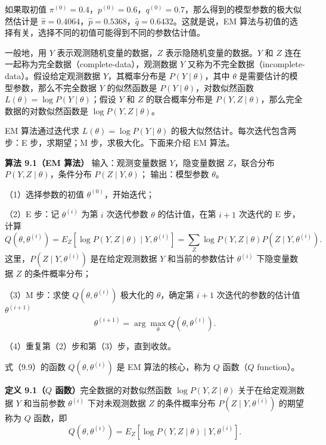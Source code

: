 \documentclass[UTF8, 12pt, fontset=fandol, oneside]{ctexart}
\begin{document}
如果取初值 $\pi^{(0)}=0.4$，$p^{(0)}=0.6$，$q^{(0)}=0.7$，那么得到的模型参数的极大似然估计是 $\hat{\pi}=0.4064$，$\hat{p}=0.5368$，$\hat{q}=0.6432$。这就是说，EM 算法与初值的选择有关，选择不同的初值可能得到不同的参数估计值。

一般地，用 $Y$ 表示观测随机变量的数据，$Z$ 表示隐随机变量的数据。$Y$ 和 $Z$ 连在一起称为完全数据（complete-data），观测数据 $Y$ 又称为不完全数据（incomplete-data）。假设给定观测数据 $Y$，其概率分布是 $P(Y\mid\theta)$，其中 $\theta$ 是需要估计的模型参数，那么不完全数据 $Y$ 的似然函数是 $P(Y\mid\theta)$，对数似然函数 $L(\theta)=\log P(Y\mid\theta)$；假设 $Y$ 和 $Z$ 的联合概率分布是 $P(Y,Z\mid\theta)$，那么完全数据的对数似然函数是 $\log P(Y,Z\mid\theta)$。

EM 算法通过迭代求 $L(\theta)=\log P(Y\mid\theta)$ 的极大似然估计。每次迭代包含两步：E 步，求期望；M 步，求极大化。下面来介绍 EM 算法。

\noindent\textbf{算法 9.1（EM 算法）}\quad
输入：观测变量数据 $Y$，隐变量数据 $Z$，联合分布 $P(Y,Z\mid\theta)$，条件分布 $P(Z\mid Y,\theta)$；
输出：模型参数 $\theta$。

（1）选择参数的初值 $\theta^{(0)}$，开始迭代；

（2）E 步：记 $\theta^{(i)}$ 为第 $i$ 次迭代参数 $\theta$ 的估计值，在第 $i+1$ 次迭代的 E 步，计算
\begin{equation}
  Q(\theta,\theta^{(i)})
  =E_Z[\log P(Y,Z\mid\theta)\mid Y,\theta^{(i)}]
  =\sum_Z \log P(Y,Z\mid\theta)P(Z\mid Y,\theta^{(i)}).
  \tag{9.9}
\end{equation}
这里，$P(Z\mid Y,\theta^{(i)})$ 是在给定观测数据 $Y$ 和当前的参数估计 $\theta^{(i)}$ 下隐变量数据 $Z$ 的条件概率分布；

（3）M 步：求使 $Q(\theta,\theta^{(i)})$ 极大化的 $\theta$，确定第 $i+1$ 次迭代的参数的估计值 $\theta^{(i+1)}$
\begin{equation}
  \theta^{(i+1)}=\arg\max_{\theta} Q(\theta,\theta^{(i)}).
  \tag{9.10}
\end{equation}

（4）重复第（2）步和第（3）步，直到收敛。

式（9.9）的函数 $Q(\theta,\theta^{(i)})$ 是 EM 算法的核心，称为 $Q$ 函数（$Q$ function）。

\noindent\textbf{定义 9.1（$Q$ 函数）}\quad 完全数据的对数似然函数 $\log P(Y,Z\mid\theta)$ 关于在给定观测数据 $Y$ 和当前参数 $\theta^{(i)}$ 下对未观测数据 $Z$ 的条件概率分布 $P(Z\mid Y,\theta^{(i)})$ 的期望称为 $Q$ 函数，即
\begin{equation}
  Q(\theta,\theta^{(i)})=E_Z[\log P(Y,Z\mid\theta)\mid Y,\theta^{(i)}].
  \tag{9.11}
\end{equation}
\end{document}
